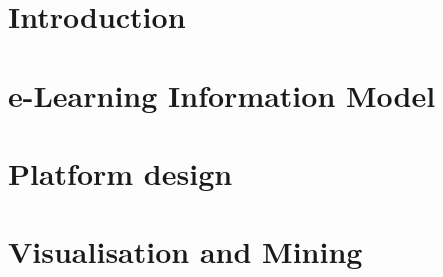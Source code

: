 \documentclass[10pt,twocolumn]{IEEEtran}
\begin{document}
 



\section{Introduction} %
\label{intro}



\section{e-Learning Information Model} %
\label{model}



\section{Platform design} %
\label{architecture}



\section{Visualisation and Mining} %
\label{visualisation}


%

%
\end{document}
